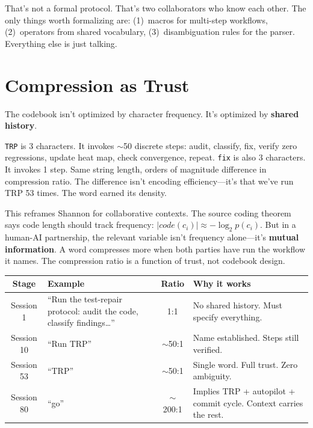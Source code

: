 \documentclass[9pt, letterpaper]{article}
\newcommand{\code}[1]{\texttt{#1}}
\begin{document}
That's not a formal protocol. That's two collaborators who know each other. The only things worth formalizing are: (1)~macros for multi-step workflows, (2)~operators from shared vocabulary, (3)~disambiguation rules for the parser. Everything else is just talking.


\section{Compression as Trust}

The codebook isn't optimized by character frequency. It's optimized by \textbf{shared history}.

\code{TRP} is 3 characters. It invokes $\sim$50 discrete steps: audit, classify, fix, verify zero regressions, update heat map, check convergence, repeat. \code{fix} is also 3 characters. It invokes 1 step. Same string length, orders of magnitude difference in compression ratio. The difference isn't encoding efficiency---it's that we've run TRP 53 times. The word earned its density.

This reframes Shannon for collaborative contexts. The source coding theorem says code length should track frequency: $|code(c_i)| \approx -\log_2 p(c_i)$. But in a human-AI partnership, the relevant variable isn't frequency alone---it's \textbf{mutual information}. A word compresses more when both parties have run the workflow it names. The compression ratio is a function of trust, not codebook design.

\vspace{0.3em}
{\small
\renewcommand{\arraystretch}{1.15}
\begin{tabularx}{\textwidth}{@{} c X c X @{}}
\toprule
\textbf{Stage} & \textbf{Example} & \textbf{Ratio} & \textbf{Why it works} \\
\midrule
Session 1 & ``Run the test-repair protocol: audit the code, classify findings\ldots'' & 1:1 & No shared history. Must specify everything. \\
Session 10 & ``Run TRP'' & $\sim$50:1 & Name established. Steps still verified. \\
Session 53 & ``TRP'' & $\sim$50:1 & Single word. Full trust. Zero ambiguity. \\
Session 80 & ``go'' & $\sim$200:1 & Implies TRP + autopilot + commit cycle. Context carries the rest. \\
\bottomrule
\end{tabularx}
}
\end{document}

